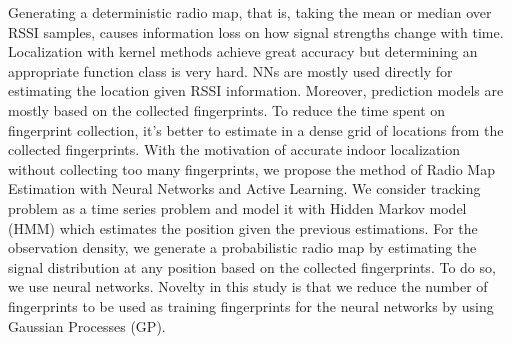 \documentclass{article}
\begin{document}
	Generating a deterministic radio map, that is, taking the mean or median over RSSI samples, causes information loss on how signal strengths change with time. Localization with kernel methods achieve great accuracy \cite{Roo2002} but determining an appropriate function class is very hard. NNs are mostly used directly for estimating the location given RSSI information. Moreover, prediction models are mostly based on the collected fingerprints. To reduce the time spent on fingerprint collection, it's better to estimate in a dense grid of locations from the collected fingerprints. With the motivation of accurate indoor localization without collecting too many fingerprints, we propose the method of Radio Map Estimation with Neural Networks and Active Learning. We consider tracking problem as a time series problem and model it with Hidden Markov model (HMM) which estimates the position  given the previous estimations. For the observation density, we generate a probabilistic radio map by estimating the signal distribution at any position based on the collected fingerprints. To do so, we use neural networks. Novelty in this study is that we reduce the number of fingerprints to be used as training fingerprints for the neural networks by using Gaussian Processes (GP). %
	
\end{document}
